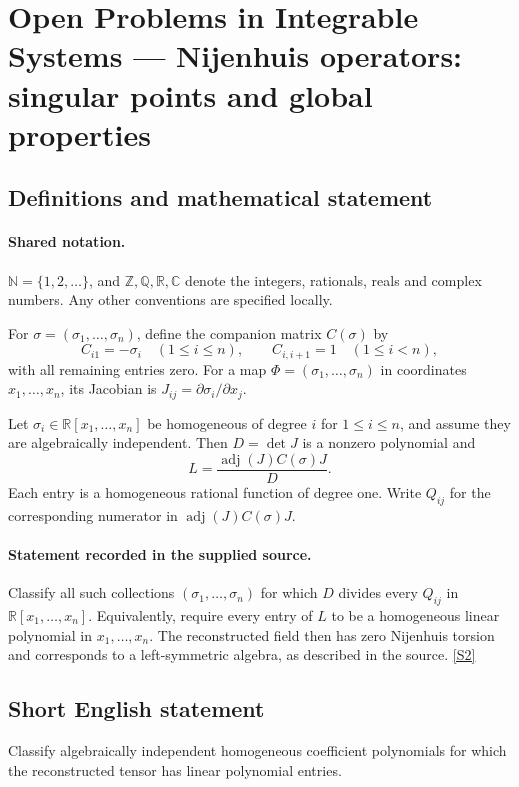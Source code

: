 \documentclass[11pt]{article}
\newcommand{\sref}[2]{\hyperlink{source:#1:#2}{[S#2]}}
\begin{document}
\section{Open Problems in Integrable Systems — Nijenhuis operators: singular points and global properties}\label{statement}

\subsection{Definitions and mathematical statement}

\paragraph{Shared notation.}$\mathbb N=\{1,2,\ldots\}$, and $\mathbb Z,\mathbb Q,\mathbb R,\mathbb C$ denote the integers, rationals, reals and complex numbers. Any other conventions are specified locally.


For $\sigma=(\sigma_1,\ldots,\sigma_n)$, define the companion matrix $C(\sigma)$ by
\[ C_{i1}=-\sigma_i\quad(1\leq i\leq n),\qquad C_{i,i+1}=1\quad(1\leq i<n), \]
with all remaining entries zero. For a map $\Phi=(\sigma_1,\ldots,\sigma_n)$ in coordinates $x_1,\ldots,x_n$, its Jacobian is $J_{ij}=\partial\sigma_i/\partial x_j$.\par Let $\sigma_i\in\mathbb R[x_1,\ldots,x_n]$ be homogeneous of degree $i$ for $1\leq i\leq n$, and assume they are algebraically independent. Then $D=\det J$ is a nonzero polynomial and
\[ L=\frac{\operatorname{adj}(J)C(\sigma)J}{D}. \]
Each entry is a homogeneous rational function of degree one. Write $Q_{ij}$ for the corresponding numerator in $\operatorname{adj}(J)C(\sigma)J$.
\paragraph{Statement recorded in the supplied source.}
Classify all such collections $(\sigma_1,\ldots,\sigma_n)$ for which $D$ divides every $Q_{ij}$ in $\mathbb R[x_1,\ldots,x_n]$. Equivalently, require every entry of $L$ to be a homogeneous linear polynomial in $x_1,\ldots,x_n$. The reconstructed field then has zero Nijenhuis torsion and corresponds to a left-symmetric algebra, as described in the source. \sref{statement}{2}
\subsection{Short English statement}
Classify algebraically independent homogeneous coefficient polynomials for which the reconstructed tensor has linear polynomial entries.
\end{document}
